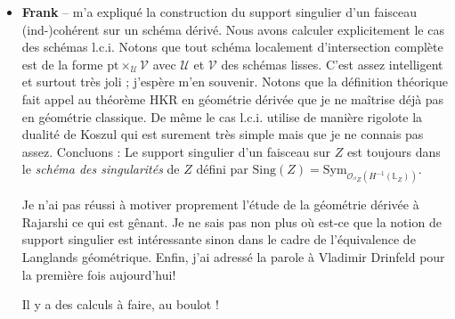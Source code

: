 \documentclass[11.8pt]{amsart}
\theoremstyle{plain}
\theoremstyle{definition}
\theoremstyle{remark}
\begin{document}
\begin{itemize}
où $P_{r+}$ est un parahorique de la filtration de Moy-Prasad et $A(G(F))_{\le r}$ l'algèbre des fonctions lisses à support compact sur $G(F)$ invariante par conjugaison par $P=P_0$ et invariantes à droite par $P_{r+}$. Cet inverse est la valeur 
$$\mathrm{Av}^{Y}(f) = \sum_P (-1)^{r(G) - r(P)} \sum_{y\in Y_P}\mathrm{Ad}(y)(f_P)$$
qui se stabilise quand $Y$ parcours les unions finies de $I$-orbites de $G(F)$ stables par action du groupe de Weyl étendu. 

Notons que ce premier résultat généralise le cas de l'unité (i.e. du projecteur) traité par Berzukavnikov et Kazhdan plus tôt. Le second résultat porte sur la construction d'éléments explicites dans ce centre de profondeur $r$. Plus précisément, Chen définit l'analogue géométrique du centre de Bernstein pour le groupe des arcs $LG$ sur $\bar{\mathbb F_p}$ par $$\mathrm{End}_{D(LG)\otimes D(LG)}{D(LG)}$$ le centre de l'$\infty$-catégorie des complexes bornés de faisceaux sur $LG$. L'application de la trace devrait redonner le centre usuel ; je ne sais pas pourquoi. Alors, une conjecture décrivant une propriété d'équivariance de Weyl des foncteurs de « transfert » d'un parahorique dans un autre permet de construire des éléments du centre catégorique donc du centre $\le r$. Ceux-ci proviennent des faisceaux pervers sur $I_r/I_{r+}$ $W$-équivariant dits très centraux.

J'ai beaucoup apprécié cet exposé (1 heure 30!) mais il manquait de clarté. Les exemples étaient trop classiques et hésitant sur les bases. 

\item \textbf{Frank} – m'a expliqué la construction du support singulier d'un faisceau (ind-)cohérent sur un schéma dérivé. Nous avons calculer explicitement le cas des schémas l.c.i. Notons que tout schéma localement d'intersection complète est de la forme $\mathrm{pt}\times_{\mathcal U} \mathcal V$ avec $\mathcal U$ et $\mathcal V$ des schémas lisses. C'est assez intelligent et surtout très joli ; j'espère m'en souvenir. Notons que la définition théorique fait appel au théorème HKR en géométrie dérivée que je ne maîtrise déjà pas en géométrie classique. De même le cas l.c.i. utilise de manière rigolote la dualité de Koszul qui est surement très simple mais que je ne connais pas assez. Concluons : Le support singulier d'un faisceau sur $Z$ est toujours dans le \textit{schéma des singularités} de $Z$ défini par $\mathrm{Sing}(Z) = \mathrm{Sym}_{\mathcal O_{^{cl}Z}(H^{-1}(\mathbb L_Z))}$. 

Je n'ai pas réussi à motiver proprement l'étude de la géométrie dérivée à Rajarshi ce qui est gênant. Je ne sais pas non plus où est-ce que la notion de support singulier est intéressante sinon dans le cadre de l'équivalence de Langlands géométrique. Enfin, j'ai adressé la parole à Vladimir Drinfeld pour la première fois aujourd'hui!

Il y a des calculs à faire, au boulot !

\end{itemize}
\end{document}
